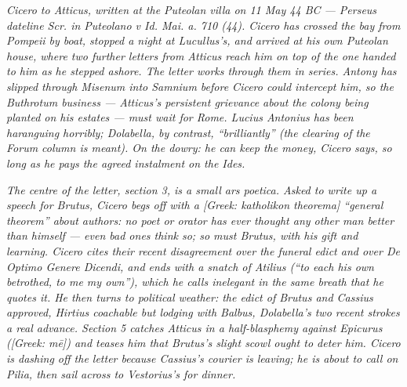 
\textit{Cicero to Atticus, written at the Puteolan villa on 11
May 44 BC --- Perseus dateline \textit{Scr. in Puteolano v Id.
Mai. a. 710 (44)}. Cicero has crossed the bay from Pompeii by
boat, stopped a night at Lucullus's, and arrived at his own
Puteolan house, where two further letters from Atticus reach
him on top of the one handed to him as he stepped ashore.
The letter works through them in series. Antony has slipped
through Misenum into Samnium before Cicero could intercept
him, so the Buthrotum business --- Atticus's persistent
grievance about the colony being planted on his estates ---
must wait for Rome. Lucius Antonius has been haranguing
horribly; Dolabella, by contrast, ``brilliantly'' (the
clearing of the Forum column is meant). On the dowry: he can
keep the money, Cicero says, so long as he pays the agreed
instalment on the Ides.}

\textit{The centre of the letter, section 3, is a small ars
poetica. Asked to write up a speech for Brutus, Cicero begs
off with a \textit{[Greek: katholikon theorema]} ``general
theorem'' about authors: no poet or orator has ever thought
any other man better than himself --- even bad ones think so;
so must Brutus, with his gift and learning. Cicero cites
their recent disagreement over the funeral edict and over
\textit{De Optimo Genere Dicendi}, and ends with a snatch of
Atilius (``to each his own betrothed, to me my own''), which
he calls inelegant in the same breath that he quotes it. He
then turns to political weather: the edict of Brutus and
Cassius approved, Hirtius coachable but lodging with Balbus,
Dolabella's two recent strokes a real advance. Section 5
catches Atticus in a half-blasphemy against Epicurus
(\textit{[Greek: m\=e]}) and teases him that Brutus's slight
scowl ought to deter him. Cicero is dashing off the letter
because Cassius's courier is leaving; he is about to call on
Pilia, then sail across to Vestorius's for dinner.}
